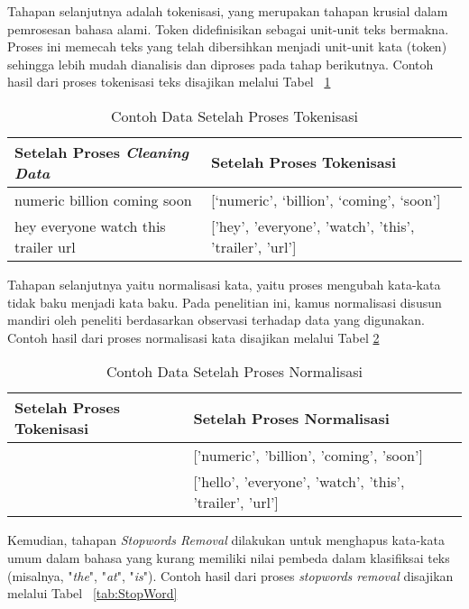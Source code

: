 \documentclass[a4paper,12pt]{report}
\numberwithin{equation}{chapter}
\begin{document}
Tahapan selanjutnya adalah tokenisasi, yang merupakan tahapan krusial dalam pemrosesan bahasa alami. Token didefinisikan sebagai unit-unit teks bermakna. Proses ini memecah teks yang telah dibersihkan menjadi unit-unit kata (token) sehingga lebih mudah dianalisis dan diproses pada tahap berikutnya. Contoh hasil dari proses tokenisasi teks disajikan melalui Tabel ~\ref{tab:tokenisasi}

\begin{table}[h!]
\centering
\caption{Contoh Data Setelah Proses Tokenisasi}
\label{tab:tokenisasi}
\begin{tabularx}{\textwidth}{|X|X|}
\hline
\textbf{Setelah Proses \textit{Cleaning Data}} & \textbf{Setelah Proses Tokenisasi} \\
\hline
numeric billion coming soon
& 
[`numeric', `billion', `coming', `soon']
 \\
\hline
hey everyone watch this trailer url & 
['hey', 'everyone', 'watch', 'this', 'trailer', 'url'] \\
\hline
\end{tabularx}
\end{table}

Tahapan selanjutnya yaitu normalisasi kata, yaitu proses mengubah kata-kata tidak baku menjadi kata baku. Pada penelitian ini, kamus normalisasi disusun mandiri oleh peneliti berdasarkan observasi terhadap data yang digunakan. Contoh hasil dari proses normalisasi kata disajikan melalui Tabel \ref{tab:normalisasi}

\begin{table}[h!]
\centering
\caption{Contoh Data Setelah Proses Normalisasi}
\label{tab:normalisasi}
\begin{tabularx}{\textwidth}{|X|X|}
\hline
\textbf{Setelah Proses Tokenisasi} & \textbf{Setelah Proses Normalisasi} \\
\hline
[`numeric', `billion', `coming', `soon'] & ['numeric', 'billion', 'coming', 'soon']
 \\
\hline
['hey', 'everyone', 'watch', 'this', 'trailer', 'url'] & ['hello', 'everyone', 'watch', 'this', 'trailer', 'url'] \\
\hline
\end{tabularx}
\end{table}

Kemudian, tahapan \textit{Stopwords Removal} dilakukan untuk menghapus kata-kata umum dalam bahasa yang kurang memiliki nilai pembeda dalam klasifiksai teks (misalnya, "\textit{the}", "\textit{at}", "\textit{is}"). Contoh hasil dari proses \textit{stopwords removal} disajikan melalui Tabel ~\ref{tab:StopWord}
\end{document}
